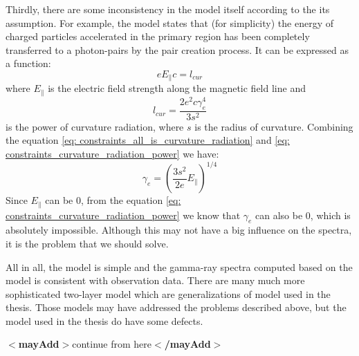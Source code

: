 \documentclass[12pt]{report}
\newcommand{\mayAdd}[1]{
  $<$\textbf{mayAdd}$>$#1$<$\textbf{/mayAdd}$>$
}
\begin{document}
    
        Thirdly, there are some inconsistency in the model itself according to the its assumption. 
        For example, the model states that (for simplicity) the energy of charged particles accelerated 
        in the primary region has been completely transferred to a photon-pairs by the pair creation process.
        It can be expressed as a function: 
        \begin{equation}
          \label{eq: constraints_all_is_curvature_radiation}
          e E_{\parallel} c = l_{cur}
        \end{equation}
        where $E_\parallel$ is the electric field strength along the magnetic field line and 
        \begin{equation}
          \label{eq: constraints_curvature_radiation_power}
          l_{cur} = \frac{2 e^2 c \gamma^{4}_{e}}{3s^2}
        \end{equation}
        is the power of curvature radiation, where $s$ is the radius of curvature. 
        Combining the equation \ref{eq: constraints_all_is_curvature_radiation} and 
        \ref{eq: constraints_curvature_radiation_power} we have: 
        \begin{equation}
          \label{eq: constraints_gamma_can_be_zero}
          \gamma_{e} = \left(\frac{3s^2}{2e} E_{\parallel}\right)^{1/4}
        \end{equation}
        Since $E_{\parallel}$ can be $0$, 
        from the equation \ref{eq: constraints_curvature_radiation_power} we know that 
        $\gamma_{e}$ can also be $0$, which is absolutely impossible. Although this may not have a big 
        influence on the spectra, it is the problem that we should solve. 

        All in all, the model is simple and the gamma-ray spectra computed based on the model is 
        consistent with observation data. There are many much more sophisticated two-layer model 
        which are generalizations of model used in the thesis. Those models may have addressed the 
        problems described above, but the model used in the thesis do have some defects. 

       \mayAdd{continue from here}

\end{document}
